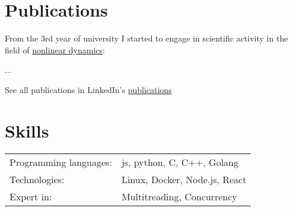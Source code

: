\documentclass[a4paper,12pt]{article}
\begin{document}
\section{Publications}

From the 3rd year of university I started to engage in scientific activity in the field of \href{https://www.wikiwand.com/en/Nonlinear_system}{nonlinear dynamics}:

\begin{refsection}
\nocite{*}
\printbibliography[heading=none]
\end{refsection}

...

See all publications in LinkedIn's \href{https://www.linkedin.com/in/dmitry-khorkin/details/publications/}{publications}

\section{Skills}
\begin{tabularx}{\linewidth}{@{}l X@{}}
Programming languages: & \normalsize{js, python, C, C++, Golang} \\
Technologies: & \normalsize{Linux, Docker, Node.js, React} \\
Expert in: & \normalsize{Multitreading, Concurrency} \\
\end{tabularx}

\vfill
{}
 
\end{document}
